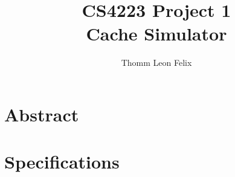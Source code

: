 \documentclass{article}
\begin{document}

\title{CS4223 Project 1\\Cache Simulator}
\author{Thomm Leon Felix}
\maketitle

\renewcommand\thesection{\arabic{section}}
\renewcommand\thesubsection{\thesection.\alph{subsection}}

\section{Abstract}

\section{Specifications}
\end{document}
